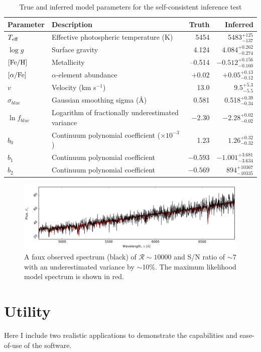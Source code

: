 \documentclass{aastex}
\begin{document}
\begin{table}
\caption{True and inferred model parameters for the self-consistent inference test}
\label{tab:inference-test}
\begin{tabular}{llrr}
\hline
\hline
Parameter & Description & Truth & Inferred \\
\hline
$T_{\rm eff}$ & Effective photospheric temperature (K) & 5454 & 5483$_{-137}^{+125}$ \\
$\log{}g$ & Surface gravity & 4.124 & 4.084$_{-0.274}^{+0.262}$ \\
${\rm [Fe/H]}$	& Metallicity & --0.514 & $-0.512_{-0.160}^{+0.156}$ \\
$[\alpha/{\rm Fe}]$ & $\alpha$-element abundance & $+0.02$ & $+0.05_{-0.12}^{+0.13}$ \\
$v$		& Velocity (km s$^{-1}$) & 13.0 & $9.5_{-5.5}^{+5.3}$ \\
$\sigma_{blue}$ & Gaussian smoothing sigma (\AA{}) & 0.581 & 0.518$_{-0.34}^{+0.39}$ \\
$\ln{f_{blue}}$ & Logarithm of fractionally underestimated variance & $-2.30$ & $-2.28_{-0.02}^{+0.02}$ \\
$b_{0}$ & Continuum polynomial coefficient ($\times10^{-3}$) & 1.23 & $1.26_{-0.32}^{+0.32}$ \\
$b_{1}$ & Continuum polynomial coefficient & $-0.593$ & $-1.001_{-3.634}^{+3.681}$ \\
$b_{2}$ & Continuum polynomial coefficient & $-0.569$ & $894_{-10335}^{+10367}$ \\
\hline
\end{tabular}
\end{table}

\begin{figure}
\label{fig:spectrum-inference}
\includegraphics[width=\textwidth]{spectrum.pdf}
\caption{A faux observed spectrum (black) of $\mathcal{R} \sim 10000$ and S/N ratio of $\sim7$ with an underestimated variance by $\sim$10\%. The maximum likelihood model spectrum is shown in red. }
\end{figure}

\section{Utility}
\label{sec:examples}
Here I include two realistic applications to demonstrate the capabilities and ease-of-use of the software.
 
\end{document}
